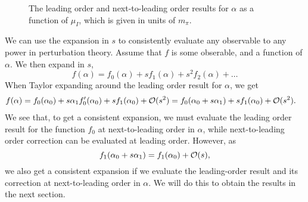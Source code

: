 \begin{figure}
    \centering
    \caption{The leading order and next-to-leading order results for $\alpha$ as a function of $\mu_I$, which is given in units of $m_\pi$. }
    \label{fig: alpha}
\end{figure}

We can use the expansion in $s$ to consistently evaluate any observable to any power in perturbation theory.
Assume that $f$ is some obserable, and a function of $\alpha$.
We then expand in $s$,
%
\begin{equation}
    f(\alpha) = f_0(\alpha) + s f_1(\alpha) + s^2 f_2(\alpha) + \dots
\end{equation}
%
When Taylor expanding around the leading order result for $\alpha$, we get
%
\begin{align*}
    f(\alpha) 
    & 
    = 
    f_0(\alpha_0)
    +
    s\alpha_1  f_0'(\alpha_0)
    +
    s f_1(\alpha_0)
    + \mathcal O(s^2)
    = f_0(\alpha_0 + s \alpha_1)
    + s f_1(\alpha_0)
    + \mathcal O(s^2).
\end{align*}
%
We see that, to get a consistent expansion, we must evaluate the leading order result for the function $f_0$ at next-to-leading order in $\alpha$, while next-to-leading order correction can be evaluated at leading order.
However, as
%
\begin{equation}
    f_1(\alpha_0 + s\alpha_1) = f_1(\alpha_0) + \mathcal O(s),
\end{equation}
%
we also get a consistent expansion if we evaluate the leading-order result and its correction at next-to-leading order in $\alpha$.
We will do this to obtain the results in the next section.
